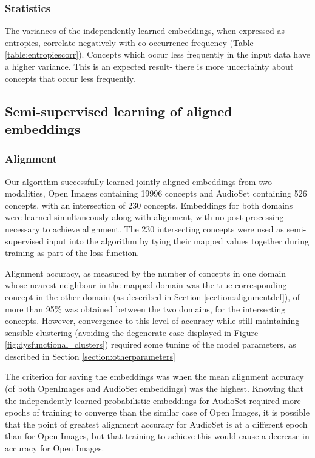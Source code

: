 \subsubsection{Statistics}
The variances of the independently learned embeddings,  when expressed as entropies, correlate negatively with co-occurrence frequency (Table \ref{table:entropiescorr}). Concepts which occur less frequently in the input data have a higher variance. This is an expected result- there is more uncertainty about concepts that occur less frequently. 

\subsection{Semi-supervised learning of aligned embeddings}

\subsubsection{Alignment}
Our algorithm successfully learned jointly aligned embeddings from two modalities, Open Images containing 19996 concepts and AudioSet containing 526 concepts, with an intersection of 230 concepts. Embeddings for both domains were learned simultaneously along with alignment, with no post-processing necessary to achieve alignment. The 230 intersecting concepts were used as semi-supervised input into the algorithm by tying their mapped values together during training as part of the loss function. 

Alignment accuracy, as measured by the number of concepts in one domain whose nearest neighbour in the mapped domain was the true corresponding concept in the other domain (as described in Section \ref{section:alignmentdef}), of more than 95\% was obtained between the two domains, for the intersecting concepts. However, convergence to this level of accuracy while still maintaining sensible clustering (avoiding the degenerate case displayed in Figure \ref{fig:dysfunctional_clusters}) required some tuning of the model parameters, as described in Section \ref{section:otherparameters}
    
The criterion for saving the embeddings was when the mean alignment accuracy (of both OpenImages and AudioSet embeddings) was the highest. Knowing that the independently learned probabilistic embeddings for AudioSet required more epochs of training to converge than the similar case of Open Images, it is possible that the point of greatest alignment accuracy for AudioSet is at a different epoch than for Open Images, but that training to achieve this would cause a decrease in accuracy for Open Images. 

